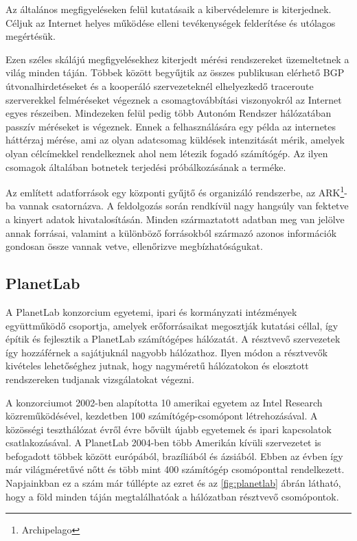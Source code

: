Az általános megfigyeléseken felül kutatásaik a kibervédelemre is kiterjednek. Céljuk az Internet helyes működése elleni tevékenységek felderítése és utólagos megértésük.


Ezen széles skálájú megfigyelésekhez kiterjedt mérési rendszereket üzemeltetnek a világ minden táján. Többek között begyűjtik az összes publikusan elérhető BGP útvonalhirdetéseket és a kooperáló szervezeteknél elhelyezkedő traceroute szerverekkel felméréseket végeznek a csomagtovábbítási viszonyokról az Internet egyes részeiben. Mindezeken felül pedig több Autonóm Rendszer hálózatában passzív méréseket is végeznek. Ennek a felhasználására egy példa az internetes háttérzaj mérése, ami az olyan adatcsomag küldések intenzitását mérik, amelyek olyan célcímekkel rendelkeznek ahol nem létezik fogadó számítógép. Az ilyen csomagok általában botnetek terjedési próbálkozásának a terméke.

Az említett adatforrások egy központi gyűjtő és organizáló rendszerbe, az ARK\footnote{Archipelago}-ba vannak csatornázva. A feldolgozás során rendkívül nagy hangsúly van fektetve a kinyert adatok hivatalosításán. Minden származtatott adatban meg van jelölve annak forrásai, valamint a különböző forrásokból származó azonos információk gondosan össze vannak vetve, ellenőrizve megbízhatóságukat.





\subsection{PlanetLab}

A PlanetLab konzorcium egyetemi, ipari és kormányzati intézmények együttműködő csoportja, amelyek erőforrásaikat megosztják kutatási céllal, így építik és fejlesztik a PlanetLab számítógépes hálózatát. A résztvevő szervezetek így hozzáférnek a sajátjuknál nagyobb hálózathoz. Ilyen módon a résztvevők kivételes lehetőséghez jutnak, hogy  nagyméretű hálózatokon és elosztott rendszereken tudjanak vizsgálatokat végezni.

A konzorciumot 2002-ben alapította 10 amerikai egyetem az Intel Research közreműködésével, kezdetben 100 számítógép-csomópont létrehozásával. A közösségi teszthálózat évről évre bővült újabb egyetemek és ipari kapcsolatok csatlakozásával. A PlanetLab 2004-ben több Amerikán kívüli szervezetet is befogadott többek között európából, brazíliából és ázsiából. Ebben az évben így már világméretűvé nőtt és több mint 400 számítógép csomóponttal rendelkezett. Napjainkban ez a szám már túllépte az ezret és az \ref{fig:planetlab} ábrán látható, hogy a föld minden táján megtalálhatóak a hálózatban résztvevő csomópontok.

